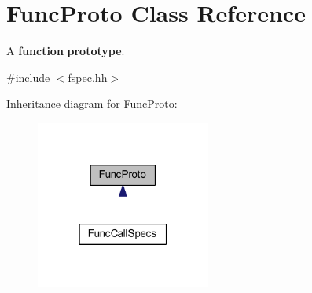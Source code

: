 \hypertarget{class_func_proto}{}\section{Func\+Proto Class Reference}
\label{class_func_proto}


A {\bfseries{function}} {\bfseries{prototype}}.  




{\ttfamily \#include $<$fspec.\+hh$>$}



Inheritance diagram for Func\+Proto\+:
\nopagebreak
\begin{figure}[H]
\begin{center}
\leavevmode
\includegraphics[width=163pt]{class_func_proto__inherit__graph}
\end{center}
\end{figure}
